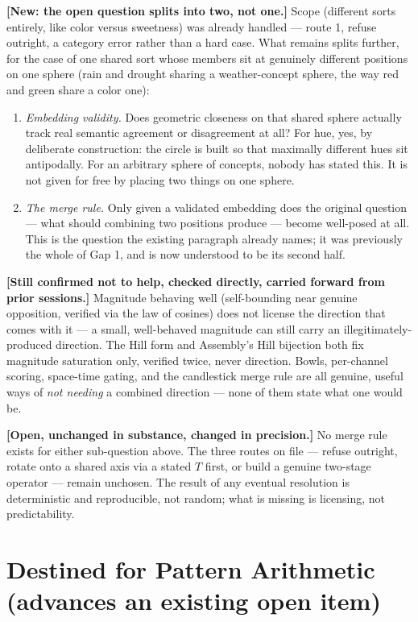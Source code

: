 \documentclass[11pt]{article}
\begin{document}
\textbf{[New: the open question splits into two, not one.]} Scope
(different sorts entirely, like color versus sweetness) was already
handled --- route 1, refuse outright, a category error rather than a
hard case. What remains splits further, for the case of one shared
sort whose members sit at genuinely different positions on one
sphere (rain and drought sharing a weather-concept sphere, the way
red and green share a color one):
\begin{enumerate}
\item \emph{Embedding validity.} Does geometric closeness on that
      shared sphere actually track real semantic agreement or
      disagreement at all? For hue, yes, by deliberate construction:
      the circle is built so that maximally different hues sit
      antipodally. For an arbitrary sphere of concepts, nobody has
      stated this. It is not given for free by placing two things on
      one sphere.
\item \emph{The merge rule.} Only given a validated embedding does
      the original question --- what should combining two positions
      produce --- become well-posed at all. This is the question the
      existing paragraph already names; it was previously the whole
      of Gap 1, and is now understood to be its second half.
\end{enumerate}

\textbf{[Still confirmed not to help, checked directly, carried
forward from prior sessions.]} Magnitude behaving well (self-bounding
near genuine opposition, verified via the law of cosines) does not
license the direction that comes with it --- a small, well-behaved
magnitude can still carry an illegitimately-produced direction. The
Hill form and Assembly's Hill bijection both fix magnitude
saturation only, verified twice, never direction. Bowls, per-channel
scoring, space-time gating, and the candlestick merge rule are all
genuine, useful ways of \emph{not needing} a combined direction ---
none of them state what one would be.

\textbf{[Open, unchanged in substance, changed in precision.]} No
merge rule exists for either sub-question above. The three routes on
file --- refuse outright, rotate onto a shared axis via a stated $T$
first, or build a genuine two-stage operator --- remain unchosen. The
result of any eventual resolution is deterministic and reproducible,
not random; what is missing is licensing, not predictability.

\section{Destined for Pattern Arithmetic (advances an existing open item)}
\end{document}
